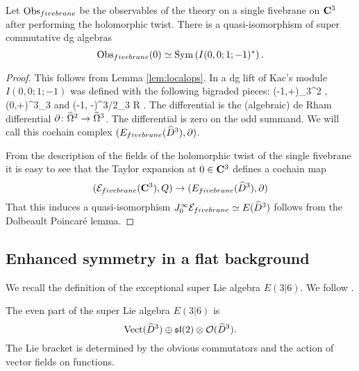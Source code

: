 \documentclass[11pt]{amsart}
\begin{document}
\begin{prop}
Let $\operatorname{Obs}_{fivebrane}$ be the observables of the theory on a single fivebrane on $\mathbf{C}^3$ after performing the holomorphic twist.
There is a quasi-isomorphism of super commutative dg algebras 
\[
\operatorname{Obs}_{fivebrane} (0) \simeq \operatorname{Sym} \left( I(0,0;1;-1)^* \right) .
\]
\end{prop}
\begin{proof}
This follows from Lemma \ref{lem:localops}.
In \cite{SWsuca6d} a dg lift of Kac's module $I(0,0;1;-1)$ was defined with the following bigraded pieces:
\beqn
{} (-1,+)\colon \quad \Hat{\Omega}_3^{2} , \qquad {} (0,+)\colon \quad \Hat{\Omega}^{3}_3
\eeqn
and
\beqn
{} (-1, -)\colon \quad \Hat{\Omega}^{3/2}_{3} \otimes R .
\eeqn
The differential is the (algebraic) de Rham differential $\partial \colon \widehat{\Omega}^2 \to \widehat{\Omega}^3$. 
The differential is zero on the odd summand.
We will call this cochain complex $(E_{fivebrane}(\widehat{D}^3), \partial)$.

From the description of the fields of the holomorphic twist of the single fivebrane it is easy to see that the Taylor expansion at $0 \in \mathbf{C}^3$ defines a cochain map
\[
(\mathcal E_{fivebrane} (\mathbf{C}^3), Q) \to (E_{fivebrane}(\widehat{D}^3), \partial) 
\]
That this induces a quasi-isomorphism $J_0^\infty \mathcal E_{fivebrane} \simeq E (\widehat{D}^3)$ follows from the Dolbeault Poincar\'e lemma.
\end{proof}

\subsection{Enhanced symmetry in a flat background}

\parsec[s:e36]

We recall the definition of the exceptional super Lie algebra $E(3|6)$. 
We follow \cite{Kac_class, KacRudakov}.

The even part of the super Lie algebra $E(3|6)$ is 
\[
\operatorname{Vect}(\widehat{D}^3) \oplus \mathfrak{sl}(2) \otimes \mathcal O(\widehat{D}^3) .
\]
The Lie bracket is determined by the obvious commutators and the action of vector fields on functions. 
\end{document}
